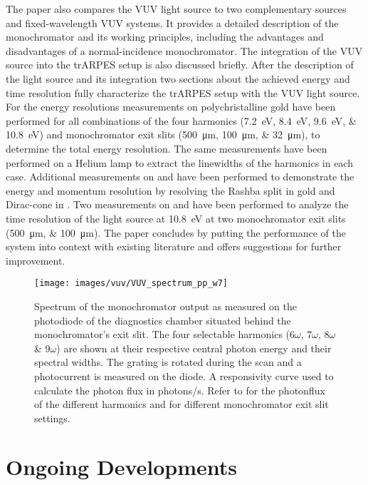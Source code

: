 The paper also compares the VUV light source to two complementary sources and fixed-wavelength VUV systems.
It provides a detailed description of the monochromator and its working principles, including the advantages and disadvantages of a normal-incidence monochromator.
The integration of the VUV source into the trARPES setup is also discussed briefly.
After the description of the light source and its integration two sections about the achieved energy and time resolution fully characterize the trARPES setup with the VUV light source.
For the energy resolutions measurements on polychristalline gold have been performed for all combinations of the four harmonics (\qtylist{7.2;8.4;9.6;10.8}{\electronvolt}) and monochromator exit slits (\qtylist{500;100;32}{\micro\meter}), to determine the total energy resolution.
The same measurements have been performed on a Helium lamp to extract the linewidths of the harmonics in each case.
Additional measurements on  and  have been performed to demonstrate the energy and momentum resolution by resolving the Rashba split in gold and Dirac-cone in .
Two measurements on  and  have been performed to analyze the time resolution of the light source at \qty{10.8}{\electronvolt} at two monochromator exit slits (\qtylist{500;100}{\micro\meter}).
The paper concludes by putting the performance of the system into context with existing literature and offers suggestions for further improvement.

\begin{figure}[h!]
	\centering
	\texttt{[image: images/vuv/VUV\_spectrum\_pp\_w7]}
	\caption{Spectrum of the monochromator output as measured on the photodiode of the diagnostics chamber situated behind the monochromator's exit slit. The four selectable harmonics ($6\omega$, $7\omega$, $8\omega$ \& $9\omega$) are shown at their respective central photon energy and their spectral widths. The grating is rotated during the scan and a photocurrent is measured on the diode. A responsivity curve used to calculate the photon flux in photons/s. Refer to \cite{hellbruck_high-resolution_2024} for the photonflux of the different harmonics and for different monochromator exit slit settings.}
	\label{fig:vuv_spectrum}
\end{figure}



\section{Ongoing Developments}

